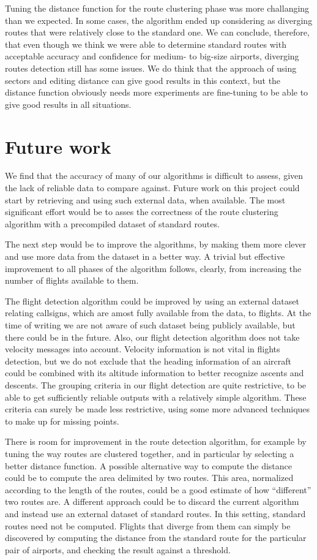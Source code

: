 \documentclass{vldb}
\begin{document}
Tuning the distance function for the route clustering phase was more challanging
than we expected. In some cases, the algorithm ended up considering as diverging
routes that were relatively close to the standard one. We can conclude,
therefore, that even though we think we were able to determine standard routes
with acceptable accuracy and confidence for medium- to big-size airports,
diverging routes detection still has some issues. We do think that the approach
of using sectors and editing distance can give good results in this context, but
the distance function obviously needs more experiments are fine-tuning to
be able to give good results in all situations.

\section{Future work}

We find that the accuracy of many of our algorithms is difficult to assess,
given the lack of reliable data to compare against. Future work on this project
could start by retrieving and using such external data, when available. The most
significant effort would be to asses the correctness of the route clustering
algorithm with a precompiled dataset of standard routes.

The next step would be to improve the algorithms, by making them more clever and
use more data from the dataset in a better way. A trivial but effective
improvement to all phases of the algorithm follows, clearly, from increasing
the number of flights available to them.

The flight detection algorithm could be improved by using an external dataset
relating callsigns, which are amost fully available from the data, to flights.
At the time of writing we are not aware of such dataset being publicly
available, but there could be in the future. Also, our flight detection
algorithm does not take velocity messages into account. Velocity information is
not vital in flights detection, but we do not exclude that the heading
information of an aircraft could be combined with its altitude information to
better recognize ascents and descents. The grouping criteria in our flight
detection are quite restrictive, to be able to get sufficiently reliable outputs
with a relatively simple algorithm. These criteria can surely be made less
restrictive, using some more advanced techniques to make up for missing points.

There is room for improvement in the route detection algorithm, for example
by tuning the way routes are clustered together, and in particular by selecting
a better distance function.
A possible alternative way to compute the distance could be to compute the area
delimited by two routes. This area, normalized according to the length of the
routes, could be a good estimate of how ``different'' two routes are.
A different approach could be to discard the current algorithm and instead use
an external dataset of standard routes. In this setting, standard routes need
not be computed. Flights that diverge from them can simply be discovered by
computing the distance from the standard route for the particular pair of
airports, and checking the result against a threshold.
\end{document}
